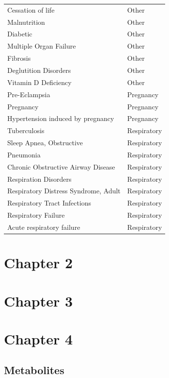 \documentclass[11pt,twoside]{bristolthesis}
\begin{document}
\begin{longtable}[t]{ll}
Cessation of life & Other\\
Malnutrition & Other\\
\addlinespace
Diabetic & Other\\
Multiple Organ Failure & Other\\
Fibrosis & Other\\
Deglutition Disorders & Other\\
Vitamin D Deficiency & Other\\
\addlinespace
Pre-Eclampsia & Pregnancy\\
Pregnancy & Pregnancy\\
Hypertension induced by pregnancy & Pregnancy\\
Tuberculosis & Respiratory\\
Sleep Apnea, Obstructive & Respiratory\\
\addlinespace
Pneumonia & Respiratory\\
Chronic Obstructive Airway Disease & Respiratory\\
Respiration Disorders & Respiratory\\
Respiratory Distress Syndrome, Adult & Respiratory\\
Respiratory Tract Infections & Respiratory\\
\addlinespace
Respiratory Failure & Respiratory\\
Acute respiratory failure & Respiratory\\
\bottomrule
\end{longtable}
\newpage

\hypertarget{chapter2-appendix}{%
\section{Chapter 2}\label{chapter2-appendix}}

\newpage

\hypertarget{chapter3-appendix}{%
\section{Chapter 3}\label{chapter3-appendix}}

\newpage

\hypertarget{chapter4-appendix}{%
\section{Chapter 4}\label{chapter4-appendix}}

\hypertarget{chapter4-appendix-metabolites}{%
\subsection{Metabolites}\label{chapter4-appendix-metabolites}}
\end{document}
